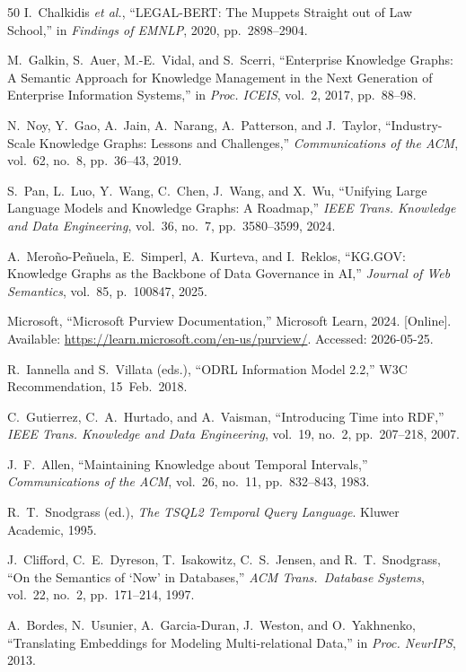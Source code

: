 \documentclass{ieeeaccess}
\begin{document}
\begin{thebibliography}{50}
I.~Chalkidis \textit{et al.}, ``LEGAL-BERT: The Muppets Straight out of Law School,'' in \textit{Findings of EMNLP}, 2020, pp.~2898--2904.

M.~Galkin, S.~Auer, M.-E.~Vidal, and S.~Scerri, ``Enterprise Knowledge Graphs: A Semantic Approach for Knowledge Management in the Next Generation of Enterprise Information Systems,'' in \textit{Proc. ICEIS}, vol.~2, 2017, pp.~88--98.

N.~Noy, Y.~Gao, A.~Jain, A.~Narang, A.~Patterson, and J.~Taylor, ``Industry-Scale Knowledge Graphs: Lessons and Challenges,'' \textit{Communications of the ACM}, vol.~62, no.~8, pp.~36--43, 2019.

S.~Pan, L.~Luo, Y.~Wang, C.~Chen, J.~Wang, and X.~Wu, ``Unifying Large Language Models and Knowledge Graphs: A Roadmap,'' \textit{IEEE Trans. Knowledge and Data Engineering}, vol.~36, no.~7, pp.~3580--3599, 2024.

A.~Mero\~{n}o-Pe\~{n}uela, E.~Simperl, A.~Kurteva, and I.~Reklos, ``KG.GOV: Knowledge Graphs as the Backbone of Data Governance in AI,'' \textit{Journal of Web Semantics}, vol.~85, p.~100847, 2025.

Microsoft, ``Microsoft Purview Documentation,'' Microsoft Learn, 2024. [Online]. Available: \url{https://learn.microsoft.com/en-us/purview/}. Accessed: 2026-05-25.

R.~Iannella and S.~Villata (eds.), ``ODRL Information Model 2.2,'' W3C Recommendation, 15~Feb.~2018.

C.~Gutierrez, C.~A.~Hurtado, and A.~Vaisman, ``Introducing Time into RDF,'' \textit{IEEE Trans. Knowledge and Data Engineering}, vol.~19, no.~2, pp.~207--218, 2007.

J.~F.~Allen, ``Maintaining Knowledge about Temporal Intervals,'' \textit{Communications of the ACM}, vol.~26, no.~11, pp.~832--843, 1983.

R.~T.~Snodgrass (ed.), \textit{The TSQL2 Temporal Query Language}. Kluwer Academic, 1995.

J.~Clifford, C.~E.~Dyreson, T.~Isakowitz, C.~S.~Jensen, and R.~T.~Snodgrass, ``On the Semantics of `Now' in Databases,'' \textit{ACM Trans.\ Database Systems}, vol.~22, no.~2, pp.~171--214, 1997.

A.~Bordes, N.~Usunier, A.~Garcia-Duran, J.~Weston, and O.~Yakhnenko, ``Translating Embeddings for Modeling Multi-relational Data,'' in \textit{Proc. NeurIPS}, 2013.


\end{thebibliography}
\end{document}
